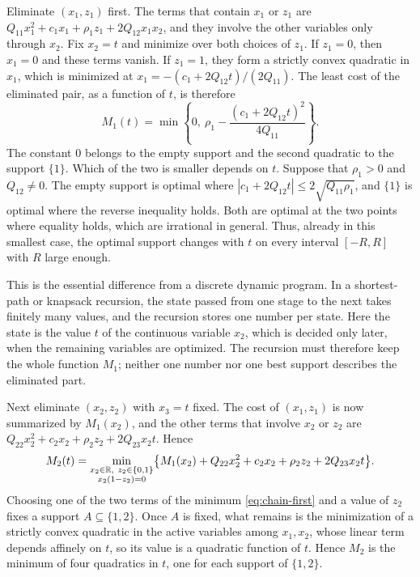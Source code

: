 Eliminate $(x_1,z_1)$ first. The terms that contain $x_1$ or $z_1$ are
$Q_{11}x_1^2+c_1x_1+\rho_1z_1+2Q_{12}x_1x_2$, and they involve the other
variables only through $x_2$. Fix $x_2=t$ and minimize over both choices
of $z_1$. If $z_1=0$, then $x_1=0$ and these terms vanish. If $z_1=1$,
they form a strictly convex quadratic in $x_1$, which is minimized at
$x_1=-(c_1+2Q_{12}t)/(2Q_{11})$. The least cost of the eliminated pair,
as a function of $t$, is therefore
\begin{equation}\label{eq:chain-first}
 M_1(t)=\min\left\{0,\ \rho_1-\frac{(c_1+2Q_{12}t)^2}{4Q_{11}}\right\}.
\end{equation}
The constant $0$ belongs to the empty support and the second quadratic to
the support $\{1\}$. Which of the two is smaller depends on $t$. Suppose
that $\rho_1>0$ and $Q_{12}\ne0$. The empty support is optimal where
$|c_1+2Q_{12}t|\le2\sqrt{Q_{11}\rho_1}$, and $\{1\}$ is optimal where the
reverse inequality holds. Both are optimal at the two points where
equality holds, which are irrational in general. Thus, already in this
smallest case, the optimal support changes with $t$ on every interval
$[-R,R]$ with $R$ large enough.

This is the essential difference from a discrete dynamic program. In a
shortest-path or knapsack recursion, the state passed from one stage to
the next takes finitely many values, and the recursion stores one number
per state. Here the state is the value $t$ of the continuous variable
$x_2$, which is decided only later, when the remaining variables are
optimized. The recursion must therefore keep the whole function $M_1$;
neither one number nor one best support describes the eliminated part.

Next eliminate $(x_2,z_2)$ with $x_3=t$ fixed. The cost of $(x_1,z_1)$ is
now summarized by $M_1(x_2)$, and the other terms that involve $x_2$ or
$z_2$ are $Q_{22}x_2^2+c_2x_2+\rho_2z_2+2Q_{23}x_2t$. Hence
\[
 M_2(t)=\min_{\substack{x_2\in\R,\ z_2\in\{0,1\}\\ x_2(1-z_2)=0}}
 \bigl\{M_1(x_2)+Q_{22}x_2^2+c_2x_2+\rho_2z_2+2Q_{23}x_2t\bigr\}.
\]
Choosing one of the two terms of the minimum \eqref{eq:chain-first} and a
value of $z_2$ fixes a support $A\subseteq\{1,2\}$. Once $A$ is fixed,
what remains is the minimization of a strictly convex quadratic in the
active variables among $x_1,x_2$, whose linear term depends affinely on
$t$, so its value is a quadratic function of $t$. Hence $M_2$ is the
minimum of four quadratics in $t$, one for each support of $\{1,2\}$.


